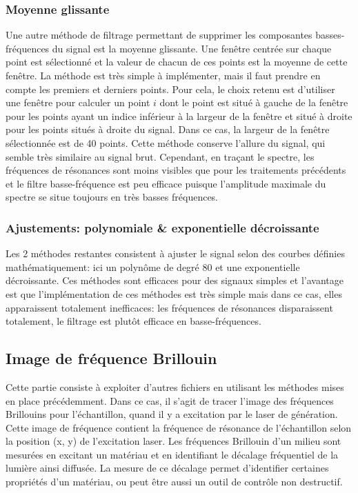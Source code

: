 \documentclass[a4paper, 11pt]{article}
\begin{document}
\subsubsection{Moyenne glissante}
Une autre méthode de filtrage permettant de supprimer les composantes basses-fréquences du signal est la moyenne glissante. Une fenêtre centrée sur chaque point est sélectionné et la valeur de chacun de ces points est la moyenne de cette fenêtre. La méthode est très simple à implémenter, mais il faut prendre en compte les premiers et derniers points. Pour cela, le choix retenu est d'utiliser une fenêtre pour calculer un point $i$ dont le point est situé à gauche de la fenêtre pour les points ayant un indice inférieur à la largeur de la fenêtre et situé à droite pour les points situés à droite du signal. Dans ce cas, la largeur de la fenêtre sélectionnée est de 40 points. Cette méthode conserve l'allure du signal, qui semble très similaire au signal brut. Cependant, en traçant le spectre, les fréquences de résonances sont moins visibles que pour les traitements précédents et le filtre basse-fréquence est peu efficace puisque l'amplitude maximale du spectre se situe toujours en très basses fréquences.
  
\subsubsection{Ajustements: polynomiale \& exponentielle décroissante}
Les 2 méthodes restantes consistent à ajuster le signal selon des courbes définies mathématiquement: ici un polynôme de degré 80 et une exponentielle décroissante. Ces méthodes sont efficaces pour des signaux simples et l'avantage est que l'implémentation de ces méthodes est très simple mais dans ce cas, elles apparaissent totalement inefficaces: les fréquences de résonances disparaissent totalement, le filtrage est plutôt efficace en basse-fréquences.

\subsection{Image de fréquence Brillouin}
Cette partie consiste à exploiter d'autres fichiers en utilisant les méthodes mises en place précédemment. Dans ce cas, il s'agit de tracer l'image des fréquences Brillouins pour l'échantillon, quand il y a excitation par le laser de génération. Cette image de fréquence contient la fréquence de résonance de l'échantillon selon la position (x, y) de l'excitation laser. Les fréquences Brillouin d'un milieu sont mesurées en excitant un matériau et en identifiant le décalage fréquentiel de la lumière ainsi diffusée. La mesure de ce décalage permet d'identifier certaines propriétés d'un matériau, ou peut être aussi un outil de contrôle non destructif.
\end{document}
